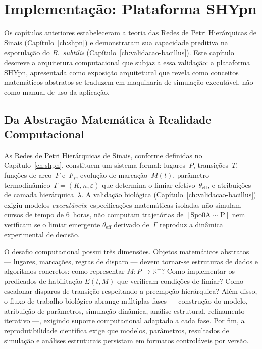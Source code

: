 \chapter{Implementação: Plataforma SHYpn}
\label{ch:implementacao}

Os capítulos anteriores estabeleceram a teoria das Redes de Petri Hierárquicas
de Sinais (Capítulo~\ref{ch:shpn}) e demonstraram sua capacidade preditiva na
esporulação do \textit{B.~subtilis} (Capítulo~\ref{ch:validacao-bacillus}).
Este capítulo descreve a arquitetura computacional que subjaz a essa validação:
a plataforma SHYpn, apresentada como exposição arquitetural que revela como
conceitos matemáticos abstratos se traduzem em maquinaria de simulação
executável, não como manual de uso da aplicação.

\section{Da Abstração Matemática à Realidade Computacional}
\label{sec:desafio-computacional}

As Redes de Petri Hierárquicas de Sinais, conforme definidas no
Capítulo~\ref{ch:shpn}, constituem um sistema formal: lugares~$P$,
transições~$T$, funções de arco~$F$ e~$F_s$, evolução de marcação~$M(t)$,
parâmetro termodinâmico~$\Gamma = (K, n, \varepsilon)$ que determina o limiar
efetivo~$\theta_{\text{eff}}$, e atribuições de camada hierárquica~$\lambda$.
A validação biológica (Capítulo~\ref{ch:validacao-bacillus})
exigiu modelos \emph{executáveis}: especificações matemáticas isoladas não
simulam cursos de tempo de 6~horas, não computam trajetórias de
$[\text{Spo0A}{\sim}\text{P}]$ nem verificam se o limiar emergente
$\theta_{\text{eff}}$ derivado de~$\Gamma$ reproduz a dinâmica experimental de
decisão.

O desafio computacional possui três dimensões.
Objetos matemáticos abstratos — lugares, marcações, regras de disparo — devem
tornar-se estruturas de dados e algoritmos concretos: como representar $M: P \to
\mathbb{R}^+$? Como implementar os predicados de habilitação $E(t, M)$ que
verificam condições de limiar? Como escalonar disparos de transição respeitando
a preempção hierárquica?
Além disso, o fluxo de trabalho biológico abrange múltiplas fases — construção
do modelo, atribuição de parâmetros, simulação dinâmica, análise estrutural,
refinamento iterativo —, exigindo suporte computacional adaptado a cada fase.
Por fim, a reprodutibilidade científica exige que modelos, parâmetros,
resultados de simulação e análises estruturais persistam em formatos
controláveis por versão.

